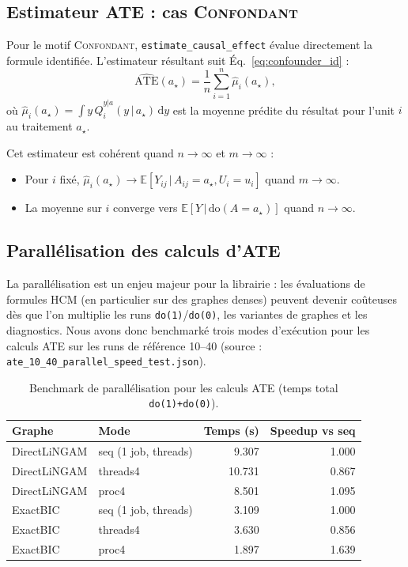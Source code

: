 \documentclass[11pt,a4paper]{article}
\newcommand{\E}[1]{\mathbb{E}\left[ #1 \right]}
\newcommand{\rmdo}{\mathrm{do}}
\newcommand{\g}{\,\vert\,}
\newcommand{\di}{\mathrm{d}}
\begin{document}
\subsection{Estimateur ATE : cas \textsc{Confondant}}

Pour le motif \textsc{Confondant}, \texttt{estimate\_causal\_effect} évalue directement la formule identifiée.
L'estimateur résultant suit Éq.~\eqref{eq:confounder_id} :
\begin{equation}
  \widehat{\text{ATE}}(a_\star) = \frac{1}{n} \sum_{i=1}^n \hat{\mu}_i(a_\star),
  \label{eq:ate_estimator}
\end{equation}
où $\hat{\mu}_i(a_\star) = \int y \, \hat{Q}^{y|a}_i(y \g a_\star) \, \di y$ est la moyenne prédite du résultat pour l'unit $i$ au traitement $a_\star$.

Cet estimateur est cohérent quand $n \to \infty$ et $m \to \infty$ :
\begin{itemize}
  \item Pour $i$ fixé, $\hat{\mu}_i(a_\star) \to \E{Y_{ij} \g A_{ij}=a_\star, U_i=u_i}$ quand $m \to \infty$.
  \item La moyenne sur $i$ converge vers $\E{Y \g \rmdo(A=a_\star)}$ quand $n \to \infty$.
\end{itemize}

\subsection{Parallélisation des calculs d'ATE}

La parallélisation est un enjeu majeur pour la librairie : les évaluations de formules HCM (en particulier sur des graphes denses) peuvent devenir coûteuses dès que l'on multiplie les runs \texttt{do(1)}/\texttt{do(0)}, les variantes de graphes et les diagnostics.
Nous avons donc benchmarké trois modes d'exécution pour les calculs ATE sur les runs de référence 10--40 (source : \texttt{ate\_10\_40\_parallel\_speed\_test.json}).

\begin{table}[h!]
\centering
\caption{Benchmark de parallélisation pour les calculs ATE (temps total \texttt{do(1)+do(0)}).}
\label{tab:parallel_ate_benchmark}
\begin{tabular}{llrr}
\toprule
\textbf{Graphe} & \textbf{Mode} & \textbf{Temps (s)} & \textbf{Speedup vs seq} \\
\midrule
DirectLiNGAM & seq (1 job, threads) & 9.307 & 1.000 \\
DirectLiNGAM & threads4              & 10.731 & 0.867 \\
DirectLiNGAM & proc4                 & 8.501 & 1.095 \\
\midrule
ExactBIC     & seq (1 job, threads) & 3.109 & 1.000 \\
ExactBIC     & threads4              & 3.630 & 0.856 \\
ExactBIC     & proc4                 & 1.897 & 1.639 \\
\bottomrule
\end{tabular}
\end{table}
\end{document}
